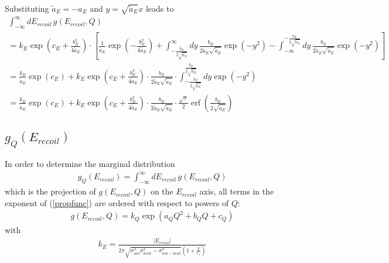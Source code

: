 Substituting $\tilde{a}_E = - a_E$ and $ y = \sqrt{\tilde{a}_E} x$ leads to
\begin{gather}
\int_{-\infty}^{\infty} dE_{recoil} \, g(E_{recoil},Q) \\
= k_E \exp \left( c_E + \frac{b_E^2}{4 \tilde{a}_E} \right) \cdot \left[
 \frac{1}{\tilde{a}_E} \exp \left( - \frac{b_E^2}{4 \tilde{a}_E} \right)
+ \int_{- \frac{b_E}{2 \sqrt{\tilde{a}_E}}}^{\infty} dy \, \frac{b_E}{2 \tilde{a}_E
\sqrt{\tilde{a}_E}} \exp ( - y^2)
- \int_{-\infty}^{- \frac{b_E}{2 \sqrt{\tilde{a}_E}}} dy \, 
\frac{b_E}{2 \tilde{a}_E \sqrt{\tilde{a}_E}} \exp ( -y^2) 
\right] \\
= \frac{k_E}{\tilde{a}_E} \exp \left( c_E \right) 
+ k_E \exp \left( c_E + \frac{b_E^2}{4 \tilde{a}_E} \right)
\cdot \frac{b_E}{2 \tilde{a}_E \sqrt{\tilde{a}_E}} \cdot
 \int_{- \frac{b_E}{2 \sqrt{\tilde{a}_E}}}^{\frac{b_E}{2 \sqrt{\tilde{a}_E}}}
dy \exp( - y^2) \\
= \frac{k_E}{\tilde{a}_E} \exp \left( c_E \right) 
+ k_E \exp \left( c_E + \frac{b_E^2}{4 \tilde{a}_E} \right)
\cdot \frac{b_E}{2 \tilde{a}_E \sqrt{\tilde{a}_E}} \cdot \frac{\sqrt{\pi}}{2}
\operatorname{erf} \left( \frac{b_E}{2 \sqrt{\tilde{a}_E}} \right) 
\end{gather}

\subsection{$g_Q(E_{recoil})$}
In order to determine the marginal distribution
\begin{gather}
g_Q(E_{recoil}) = \int_{-\infty}^\infty dE_{recoil} \, g(E_{recoil},Q)
\end{gather}
which is the projection of $g(E_{recoil},Q)$ on the $E_{recoil}$ axis, 
all terms in the exponent of (\ref{propfunc}) are ordered 
with respect to powers of $Q$:
\begin{gather}
g(E_{recoil},Q) = k_Q  \exp ( a_Q Q^2 +
b_Q Q + c_Q ) \label{propfuncQ}
\end{gather}
with
\begin{gather}
k_E = \frac{\left| E_{recoil} \right| }{2 \pi \sqrt{\sigma_{ion}^2 \sigma_{heat}^2 - \sigma_{ion-heat}^4}
 \left(1 + \frac{V}{\epsilon_\gamma}\right)} \\
\end{gather}


